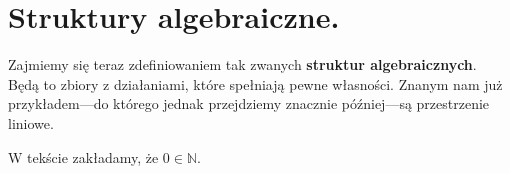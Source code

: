 \chapter{Struktury algebraiczne.}\label{ch:algebraic-structures}

Zajmiemy się teraz zdefiniowaniem tak zwanych \textbf{struktur algebraicznych}.
Będą to zbiory z działaniami, które spełniają pewne własności.
Znanym nam już przykładem{\mbox{---}}do którego jednak przejdziemy znacznie później---są przestrzenie liniowe.

W tekście zakładamy, że $0 \in \mathbb{N}$.






